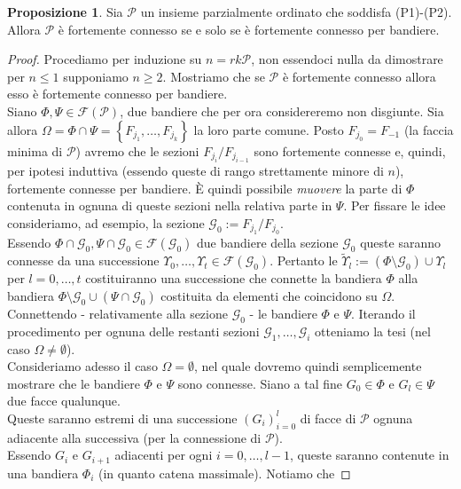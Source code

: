 \documentclass[a4paper,12pt]{report}
\newcommand{\p}{\mathcal{P}}
\theoremstyle{plain}
\theoremstyle{definition}
\newtheorem{prop}[teo]{Proposizione}
\begin{document}
\begin{prop}
\label{prop:P3Flags}
Sia $\p$ un insieme parzialmente ordinato che soddisfa (P1)-(P2). Allora $\p$ \`e fortemente connesso se e solo se \`e fortemente
connesso per bandiere.
\end{prop}
\begin{proof}
Procediamo per induzione su $n=rk\p$, non essendoci nulla da dimostrare per $n\leq 1$ supponiamo $n\geq 2$. Mostriamo che se $\p$ \`e
fortemente connesso allora esso \`e fortemente connesso per bandiere.\\
Siano $\Phi,\Psi\in\mathcal{F}(\p)$, due bandiere che per ora considereremo non disgiunte. Sia allora $\Omega=\Phi\cap\Psi=\left\{F_{j_1},\dots,F_{j_k}\right\}$ 
la loro parte comune. Posto $F_{j_0}=F_{-1}$ (la faccia minima di $\p$) avremo che le sezioni $F_{j_i}/F_{j_{i-1}}$ sono fortemente connesse e, quindi,
per ipotesi induttiva (essendo queste di rango strettamente minore di $n$), fortemente connesse per bandiere. \`E quindi possibile \emph{muovere} la parte di
$\Phi$ contenuta in ognuna di queste sezioni nella relativa parte in $\Psi$. Per fissare le idee consideriamo, ad esempio, la sezione
$\mathcal{G}_0:=F_{j_1}/F_{j_0}$.\\
Essendo $\Phi\cap\mathcal{G}_0,\Psi\cap\mathcal{G}_0\in\mathcal{F}(\mathcal{G}_0)$ due bandiere della sezione $\mathcal{G}_0$ queste saranno connesse da una 
successione $\Upsilon_0,\dots,\Upsilon_t\in\mathcal{F}(\mathcal{G}_0)$. Pertanto le $\widetilde{\Upsilon}_l:=(\Phi\setminus\mathcal{G}_0)\cup\Upsilon_l$ per
$l=0,\dots,t$ costituiranno una successione che connette la bandiera $\Phi$ alla bandiera $\Phi\setminus\mathcal{G}_0\cup(\Psi\cap\mathcal{G}_0)$
costituita da elementi che coincidono su $\Omega$.
Connettendo - relativamente alla sezione $\mathcal{G}_0$ - le bandiere $\Phi$ e $\Psi$. Iterando il procedimento per ognuna delle restanti sezioni
$\mathcal{G}_1,\dots,\mathcal{G}_i$ otteniamo la tesi (nel caso $\Omega\ne\emptyset$).\\
Consideriamo adesso il caso $\Omega=\emptyset$, nel quale dovremo quindi semplicemente mostrare che le bandiere $\Phi$ e $\Psi$ sono connesse.
Siano a tal fine $G_0\in\Phi$ e $G_l\in\Psi$ due facce qualunque.\\
Queste saranno estremi di una successione $(G_i)_{i=0}^l$ di facce di $\p$
ognuna adiacente alla successiva (per la connessione di $\p$).\\
Essendo $G_i$ e $G_{i+1}$ adiacenti per ogni $i=0,\dots,l-1$, queste saranno contenute in una bandiera $\Phi_i$ (in quanto catena massimale). Notiamo che

\end{proof}
\end{document}
